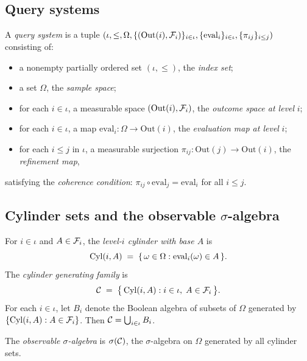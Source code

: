 \subsection{Query systems}

\begin{definition}
A \emph{query system} is a tuple
$(\iota, \leq, \Omega, \{(\mathrm{Out}(i), \mathcal{F}_i)\}_{i \in \iota},
\{\mathrm{eval}_i\}_{i \in \iota}, \{\pi_{ij}\}_{i \leq j})$
consisting of:
\begin{itemize}[noitemsep]
  \item a nonempty partially ordered set $(\iota, \leq)$, the \emph{index set};
  \item a set $\Omega$, the \emph{sample space};
  \item for each $i \in \iota$, a measurable space $(\mathrm{Out}(i), \mathcal{F}_i)$,
    the \emph{outcome space at level} $i$;
  \item for each $i \in \iota$, a map $\mathrm{eval}_i : \Omega \to \mathrm{Out}(i)$,
    the \emph{evaluation map at level} $i$;
  \item for each $i \leq j$ in $\iota$, a measurable surjection
    $\pi_{ij} : \mathrm{Out}(j) \to \mathrm{Out}(i)$, the \emph{refinement map},
\end{itemize}
satisfying the \emph{coherence condition}: $\pi_{ij} \circ \mathrm{eval}_j =
\mathrm{eval}_i$ for all $i \leq j$.
\end{definition}

\subsection{Cylinder sets and the observable \texorpdfstring{$\sigma$}{sigma}-algebra}

\begin{definition}
For $i \in \iota$ and $A \in \mathcal{F}_i$, the \emph{level-$i$ cylinder with base $A$} is
\[
  \mathrm{Cyl}(i,A) \;=\; \{\,\omega \in \Omega : \mathrm{eval}_i(\omega) \in A\,\}.
\]
The \emph{cylinder generating family} is
\[
  \mathcal{C} \;=\; \bigl\{\,\mathrm{Cyl}(i,A) : i \in \iota,\; A \in \mathcal{F}_i\,\bigr\}.
\]
For each $i \in \iota$, let $B_i$ denote the Boolean algebra of subsets of $\Omega$
generated by $\{\mathrm{Cyl}(i,A) : A \in \mathcal{F}_i\}$.  Then $\mathcal{C} = \bigcup_{i \in \iota} B_i$.

The \emph{observable $\sigma$-algebra} is $\sigma(\mathcal{C})$, the $\sigma$-algebra on
$\Omega$ generated by all cylinder sets.
\end{definition}

